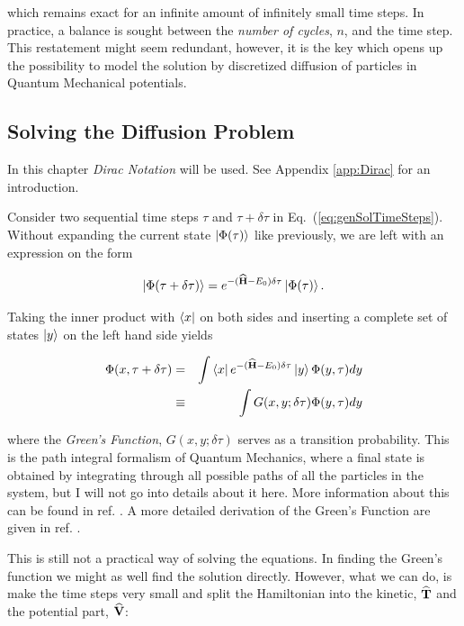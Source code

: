 which remains exact for an infinite amount of infinitely small time steps. In practice, a balance is sought between the \textit{number of cycles}, $n$, and the time step. This restatement might seem redundant, however, it is the key which opens up the possibility to model the solution by discretized diffusion of particles in Quantum Mechanical potentials. 

\subsection{Solving the Diffusion Problem}

In this chapter \textit{Dirac Notation} will be used. See Appendix \ref{app:Dirac} for an introduction.

Consider two sequential time steps $\tau$ and $\tau + \delta\tau$ in Eq.~(\ref{eq:genSolTimeSteps}). Without expanding the current state $\left| \Phi(\tau) \right>$ like previously, we are left with an expression on the form

\begin{equation*}
 \left| \Phi(\tau + \delta\tau) \right> = e^{-({\bf\widehat{H}} - E_0)\delta\tau}\left| \Phi(\tau) \right>.
\end{equation*}

Taking the inner product with $\left< x \right|$ on both sides and inserting a complete set of states $\left| y \right>$ on the left hand side yields

\begin{eqnarray*}
 \Phi(x, \tau + \delta\tau) &=& \int \left< x \right|e^{-({\bf\widehat{H}} - E_0)\delta\tau}\left| y \right>\Phi(y, \tau)dy \\
			     &\equiv& \int G(x, y; \delta\tau)\Phi(y, \tau)dy
\end{eqnarray*}

where the \textit{Green's Function}, $G(x, y; \delta\tau)$ serves as a transition probability. This is the path integral formalism of Quantum Mechanics, where a final state is obtained by integrating through all possible paths of all the particles in the system, but I will not go into details about it here. More information about this can be found in ref. \cite{leinaas}. A more detailed derivation of the Green's Function are given in ref. \cite{abInitioMC}.

This is still not a practical way of solving the equations. In finding the Green's function we might as well find the solution directly. However, what we can do, is make the time steps very small and split the Hamiltonian into the kinetic, ${\bf\widehat{T}}$ and the potential part, ${\bf\widehat{V}}$:

